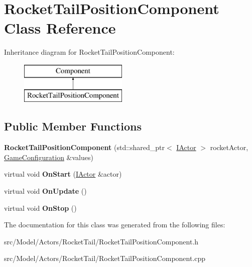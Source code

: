 \hypertarget{classRocketTailPositionComponent}{}\section{Rocket\+Tail\+Position\+Component Class Reference}
\label{classRocketTailPositionComponent}
Inheritance diagram for Rocket\+Tail\+Position\+Component\+:\begin{figure}[H]
\begin{center}
\leavevmode
\includegraphics[height=2.000000cm]{classRocketTailPositionComponent}
\end{center}
\end{figure}
\subsection*{Public Member Functions}
\begin{DoxyCompactItemize}
\item 
{\bfseries Rocket\+Tail\+Position\+Component} (std\+::shared\+\_\+ptr$<$ \hyperlink{classIActor}{I\+Actor} $>$ rocket\+Actor, \hyperlink{classGameConfiguration}{Game\+Configuration} \&values)\hypertarget{classRocketTailPositionComponent_a75ea9bb2a7c24f85a600a30d4c756ed8}{}\label{classRocketTailPositionComponent_a75ea9bb2a7c24f85a600a30d4c756ed8}

\item 
virtual void {\bfseries On\+Start} (\hyperlink{classIActor}{I\+Actor} \&actor)\hypertarget{classRocketTailPositionComponent_ab207a504a0ec0ad62a049853d489e565}{}\label{classRocketTailPositionComponent_ab207a504a0ec0ad62a049853d489e565}

\item 
virtual void {\bfseries On\+Update} ()\hypertarget{classRocketTailPositionComponent_a9ddae56c0fe4d157f13d31ee54479ecd}{}\label{classRocketTailPositionComponent_a9ddae56c0fe4d157f13d31ee54479ecd}

\item 
virtual void {\bfseries On\+Stop} ()\hypertarget{classRocketTailPositionComponent_a9f110b958d731b2033b126c7308b3b4f}{}\label{classRocketTailPositionComponent_a9f110b958d731b2033b126c7308b3b4f}

\end{DoxyCompactItemize}


The documentation for this class was generated from the following files\+:\begin{DoxyCompactItemize}
\item 
src/\+Model/\+Actors/\+Rocket\+Tail/Rocket\+Tail\+Position\+Component.\+h\item 
src/\+Model/\+Actors/\+Rocket\+Tail/Rocket\+Tail\+Position\+Component.\+cpp\end{DoxyCompactItemize}
